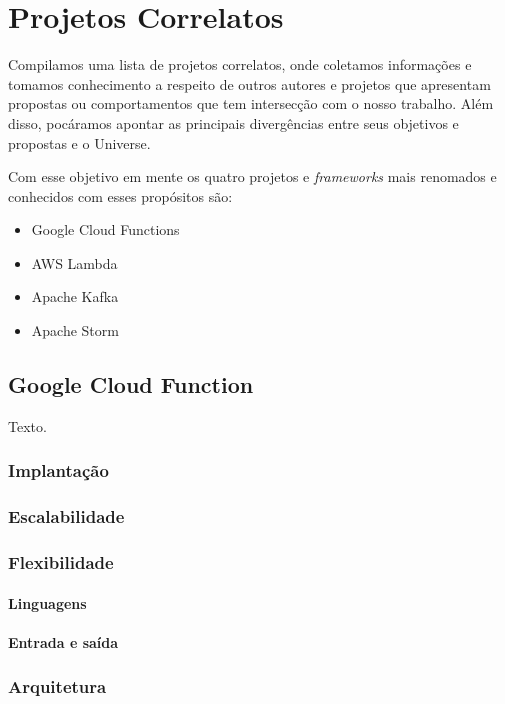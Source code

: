 \chapter{Projetos Correlatos}

Compilamos uma lista de projetos correlatos, onde coletamos informações e tomamos conhecimento a respeito de outros autores e projetos que apresentam propostas ou comportamentos que tem intersecção com o nosso trabalho. Além disso, pocáramos apontar as principais divergências entre seus objetivos e propostas e o Universe.
\bigskip

Com esse objetivo em mente os quatro projetos e \textit{frameworks} mais renomados e conhecidos com esses propósitos são:
\begin{itemize}
	\item Google Cloud Functions
	\item AWS Lambda
	\item Apache Kafka
	\item Apache Storm
\end{itemize}

\section{Google Cloud Function}

Texto.

\subsection{Implantação}

\subsection{Escalabilidade}

\subsection{Flexibilidade}

\subsubsection{Linguagens}
\subsubsection{Entrada e saída}

\subsection{Arquitetura}

